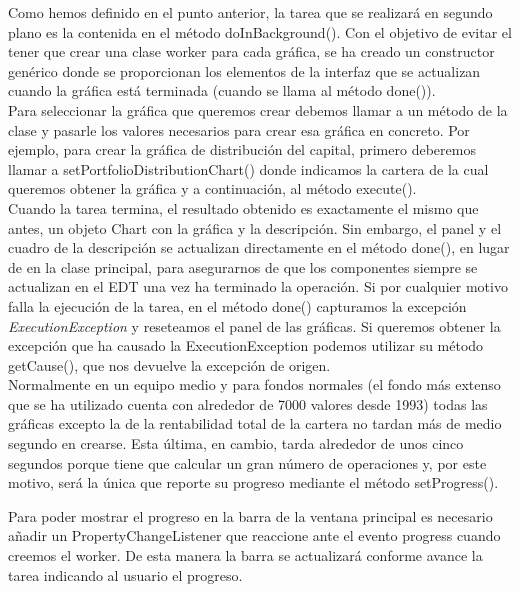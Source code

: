 \documentclass[12pt, a4paper]{book}
\begin{document}
Como hemos definido en el punto anterior, la tarea que se realizará en segundo plano es la contenida en el método doInBackground(). Con el objetivo de evitar el tener que crear una clase worker para cada gráfica, se ha creado un constructor genérico donde se proporcionan los elementos de la interfaz que se actualizan cuando la gráfica está terminada (cuando se llama al método done()).\\

Para seleccionar la gráfica que queremos crear debemos llamar a un método de la clase y pasarle los valores necesarios para crear esa gráfica en concreto. Por ejemplo, para crear la gráfica de distribución del capital, primero deberemos llamar a setPortfolioDistributionChart() donde indicamos la cartera de la cual queremos obtener la gráfica y a continuación, al método execute().\\

Cuando la tarea termina, el resultado obtenido es exactamente el mismo que antes, un objeto Chart con la gráfica y la descripción. Sin embargo, el panel y el cuadro de la descripción se actualizan directamente en el método done(), en lugar de en la clase principal, para asegurarnos de que los componentes siempre se actualizan en el \gls{EDT} una vez ha terminado la operación. Si por cualquier motivo falla la ejecución de la tarea, en el método done() capturamos la excepción \textit{ExecutionException} y reseteamos el panel de las gráficas. Si queremos obtener la excepción que ha causado la ExecutionException podemos utilizar su método getCause(), que nos devuelve la excepción de origen.\\

Normalmente en un equipo medio y para fondos normales (el fondo más extenso que se ha utilizado cuenta con alrededor de 7000 valores desde 1993) todas las gráficas excepto la de la rentabilidad total de la cartera no tardan más de medio segundo en crearse. Esta última, en cambio, tarda alrededor de unos cinco segundos porque tiene que calcular un gran número de operaciones y, por este motivo, será la única que reporte su progreso mediante el método setProgress().\\


\newpage

Para poder mostrar el progreso en la barra de la ventana principal es necesario añadir un PropertyChangeListener que reaccione ante el evento progress cuando creemos el worker. De esta manera la barra se actualizará conforme avance la tarea indicando al usuario el progreso.\\
\end{document}
